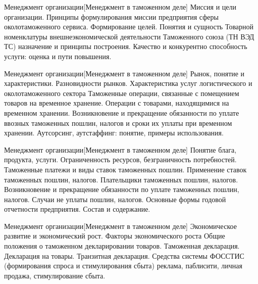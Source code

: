 \documentclass[
	11pt,
	a4paper,
	]
	{article}
\begin{document}
\vfill



\begin{minipage}[t][\miniH]{\miniL}\centering
	 {Менеджмент организации}[Менеджмент в таможенном деле]
		{
			Миссия и цели организации. Принципы формулирования миссии предприятия сферы околотаможенного сервиса. Формирование целей.
		}{
			Понятия и сущность Товарной номенклатуры внешнеэкономической деятельности Таможенного союза (ТН ВЭД ТС) назначение и принципы построения.
		}{
			Качество и конкурентно способность услуги: оценка и пути повышения.
		}
	\lowGE
\end{minipage}

\vfill



\begin{minipage}[t][\miniH]{\miniL}\centering
	 {Менеджмент организации}[Менеджмент в таможенном деле]
		{
			Рынок, понятие и характеристики. Разновидности рынков. Характеристика услуг логистического и околотаможенного сектора
		}{
			Таможенные операции, связанные с помещением товаров на временное хранение. Операции с товарами, находящимися на временном хранении. Возникновение и прекращение обязанности по уплате ввозных таможенных пошлин, налогов и сроки их уплаты при временном хранении.
		}{
			Аутсорсинг, аутстаффинг: понятие, примеры использования.
		}
	\lowGE
\end{minipage}





\begin{minipage}[t][\miniH]{\miniL}\centering
	 {Менеджмент организации}[Менеджмент в таможенном деле]
		{
			Понятие блага, продукта, услуги. Ограниченность ресурсов, безграничность потребностей.
		}{
			Таможенные платежи и виды ставок таможенных пошлин. Применение ставок таможенных пошлин, налогов. Плательщики таможенных пошлин, налогов. Возникновение и прекращение обязанности по уплате таможенных пошлин, налогов. Случаи не уплаты пошлин, налогов.
		}{
			Основные формы годовой отчетности предприятия. Состав и содержание.
		}
	\lowGE
\end{minipage}

\vfill



\begin{minipage}[t][\miniH]{\miniL}\centering
	 {Менеджмент организации}[Менеджмент в таможенном деле]
		{
			Экономическое развитие и экономический рост. Факторы экономического роста
		}{
			Общие положения о таможенном декларировании товаров. Таможенная декларация. Декларация на товары. Транзитная декларация.
		}{
			Средства системы ФОССТИС (формирования спроса и стимулирования сбыта) реклама, паблисити, личная продажа, стимулирование сбыта.
		}
	\lowGE
\end{minipage}
\end{document}
